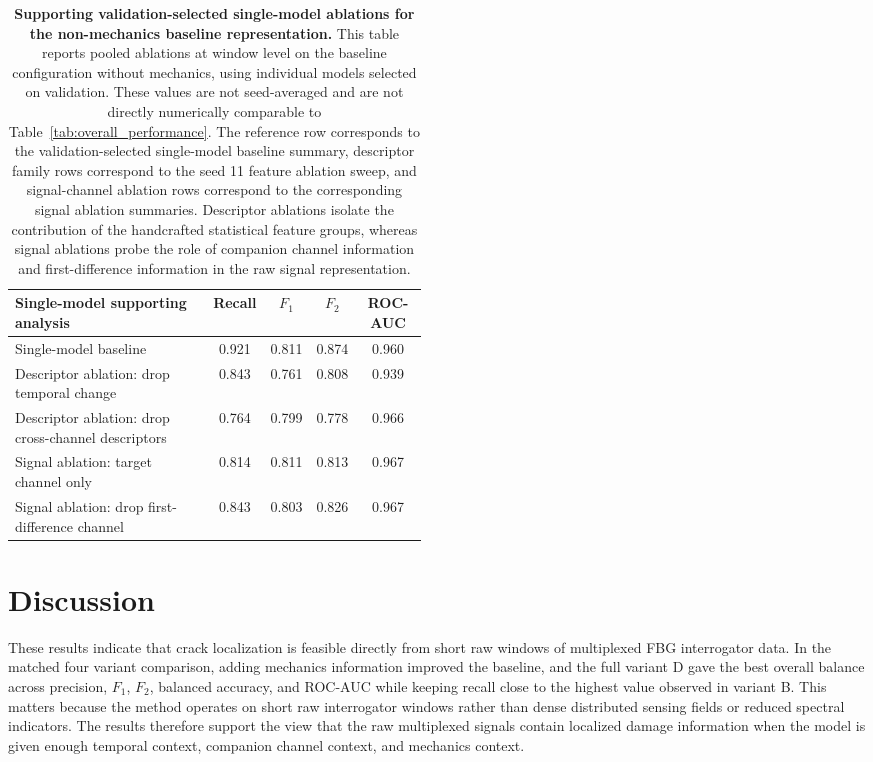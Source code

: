 \documentclass[fleqn,10pt]{wlscirep}
\begin{document}
\begin{table}[htbp]
\centering
\caption{\textbf{Supporting validation-selected single-model ablations for the non-mechanics baseline representation.} This table reports pooled ablations at window level on the baseline configuration without mechanics, using individual models selected on validation. These values are not seed-averaged and are not directly numerically comparable to Table~\ref{tab:overall_performance}. The reference row corresponds to the validation-selected single-model baseline summary, descriptor family rows correspond to the seed 11 feature ablation sweep, and signal-channel ablation rows correspond to the corresponding signal ablation summaries. Descriptor ablations isolate the contribution of the handcrafted statistical feature groups, whereas signal ablations probe the role of companion channel information and first-difference information in the raw signal representation.}
\label{tab:ablation_summary}
\small
\begin{tabular}{p{0.48\linewidth}cccc}
\hline
Single-model supporting analysis & Recall & $F_1$ & $F_2$ & ROC-AUC \\
\hline
Single-model baseline & 0.921 & 0.811 & 0.874 & 0.960 \\
Descriptor ablation: drop temporal change & 0.843 & 0.761 & 0.808 & 0.939 \\
Descriptor ablation: drop cross-channel descriptors & 0.764 & 0.799 & 0.778 & 0.966 \\
Signal ablation: target channel only & 0.814 & 0.811 & 0.813 & 0.967 \\
Signal ablation: drop first-difference channel & 0.843 & 0.803 & 0.826 & 0.967 \\
\hline
\end{tabular}
\end{table}

\FloatBarrier

\section*{Discussion}

These results indicate that crack localization is feasible directly from short raw windows of multiplexed FBG interrogator data. In the matched four variant comparison, adding mechanics information improved the baseline, and the full variant D gave the best overall balance across precision, $F_1$, $F_2$, balanced accuracy, and ROC-AUC while keeping recall close to the highest value observed in variant B. This matters because the method operates on short raw interrogator windows rather than dense distributed sensing fields or reduced spectral indicators. The results therefore support the view that the raw multiplexed signals contain localized damage information when the model is given enough temporal context, companion channel context, and mechanics context.
\end{document}
